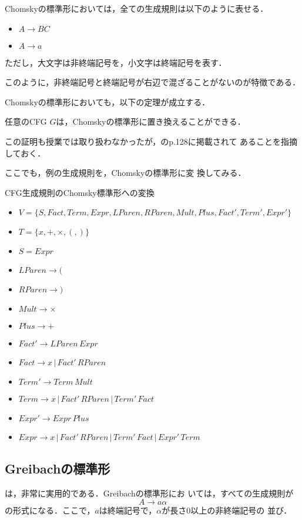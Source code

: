 Chomskyの標準形においては，全ての生成規則は以下のように表せる．
\begin{itemize}
 \item $A \rightarrow BC$
 \item $A \rightarrow a$
\end{itemize}
ただし，大文字は非終端記号を，小文字は終端記号を表す．

このように，非終端記号と終端記号が右辺で混ざることがないのが特徴である．

Chomskyの標準形においても，以下の定理が成立する．
\begin{mytheorem}
 任意のCFG $G$は，Chomskyの標準形に置き換えることができる．
\end{mytheorem}

この証明も授業では取り扱わなかったが，\cite{波雄1972}のp.128に掲載されて
あることを指摘しておく．

ここでも，例の生成規則を，Chomskyの標準形に変
換してみる．
\begin{myexample}{CFG生成規則のChomsky標準形への変換}
 \begin{itemize}
  \item $V = \{S, Fact, Term, Expr, LParen, RParen, Mult, Plus, Fact',
        Term', Expr'\}$
  \item $T = \{x, +, \times, (, )\}$
  \item $S = Expr$
  \item $LParen \rightarrow ($
  \item $RParen \rightarrow )$
  \item $Mult \rightarrow \times$
  \item $Plus \rightarrow +$
  \item $Fact' \rightarrow LParen\, Expr$
  \item $Fact \rightarrow x\, |\, Fact'\, RParen$
  \item $Term' \rightarrow Term\, Mult$
  \item $Term \rightarrow x\, |\, Fact'\, RParen\, |\, Term'\, Fact$
  \item $Expr' \rightarrow Expr\, Plus$
  \item $Expr \rightarrow x\, |\, Fact'\, RParen\, |\, Term'\, Fact\, |\, Expr'\, Term$
 \end{itemize}
\end{myexample}

\subsection{Greibachの標準形}
は，非常に実用的である．Greibachの標準形にお
いては，すべての生成規則が
\[
 A \rightarrow a \alpha
\]
の形式になる．ここで，$a$は終端記号で，$\alpha$が長さ0以上の非終端記号の
並び．

